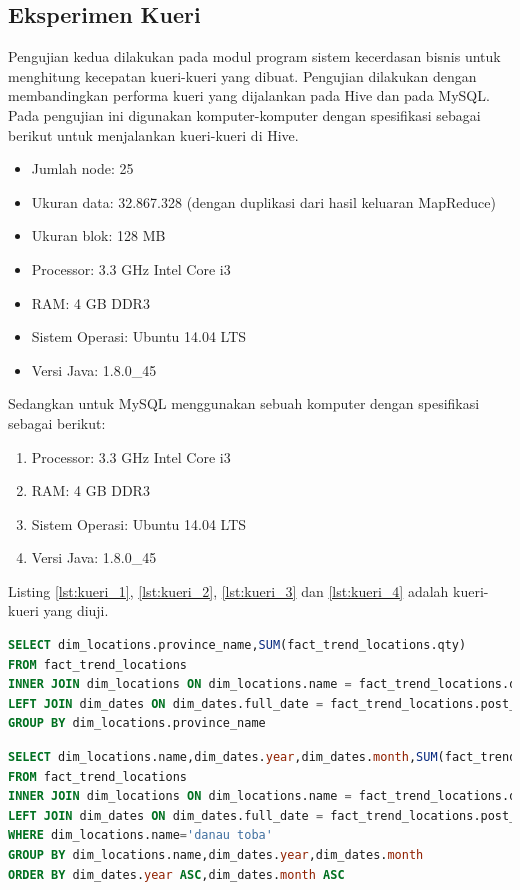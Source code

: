 \subsection{Eksperimen Kueri}
Pengujian kedua dilakukan pada modul program sistem kecerdasan bisnis untuk menghitung kecepatan kueri-kueri yang dibuat. Pengujian dilakukan dengan membandingkan performa kueri yang dijalankan pada Hive dan pada MySQL. Pada pengujian ini digunakan komputer-komputer dengan spesifikasi sebagai berikut untuk menjalankan kueri-kueri di Hive.
\begin{itemize}
	\item Jumlah node: 25 
	\item Ukuran data: 32.867.328 (dengan duplikasi dari hasil keluaran MapReduce)
	\item Ukuran blok: 128 MB
	\item Processor: 3.3 GHz Intel Core i3
	\item RAM: 4 GB DDR3
	\item Sistem Operasi: Ubuntu 14.04 LTS
	\item Versi Java: 1.8.0\_45
\end{itemize}

Sedangkan untuk MySQL menggunakan sebuah komputer dengan spesifikasi sebagai berikut:
\begin{enumerate}
	\item Processor: 3.3 GHz Intel Core i3
	\item RAM: 4 GB DDR3
	\item Sistem Operasi: Ubuntu 14.04 LTS
	\item Versi Java: 1.8.0\_45
\end{enumerate}

Listing \ref{lst:kueri_1}, \ref{lst:kueri_2}, \ref{lst:kueri_3} dan \ref{lst:kueri_4} adalah kueri-kueri yang diuji.

\begin{lstlisting}[language=SQL,basicstyle=\tiny,caption=Mencari tren wisata per provinsi,label={lst:kueri_1}]
SELECT dim_locations.province_name,SUM(fact_trend_locations.qty) 
FROM fact_trend_locations 
INNER JOIN dim_locations ON dim_locations.name = fact_trend_locations.destination 
LEFT JOIN dim_dates ON dim_dates.full_date = fact_trend_locations.post_date  
GROUP BY dim_locations.province_name 
\end{lstlisting}

\begin{lstlisting}[language=SQL,basicstyle=\tiny,caption=Mencari tren suatu lokasi wisata dari bulan ke bulan,label={lst:kueri_2}]
SELECT dim_locations.name,dim_dates.year,dim_dates.month,SUM(fact_trend_locations.qty) 
FROM fact_trend_locations 
INNER JOIN dim_locations ON dim_locations.name = fact_trend_locations.destination 
LEFT JOIN dim_dates ON dim_dates.full_date = fact_trend_locations.post_date  
WHERE dim_locations.name='danau toba' 
GROUP BY dim_locations.name,dim_dates.year,dim_dates.month 
ORDER BY dim_dates.year ASC,dim_dates.month ASC 
\end{lstlisting}

